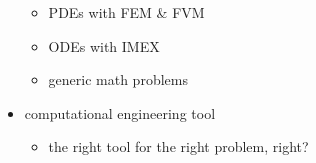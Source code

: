 \documentclass[
  ignorenonframetext,
  aspectratio=169,
]{beamer}
\providecommand{\tightlist}{%
  \setlength{\itemsep}{0pt}\setlength{\parskip}{0pt}}
\begin{document}
\begin{frame}{}
\begin{columns}[T]
\begin{column}{0.4\textwidth}
\begin{itemize}
  \begin{itemize}
  \tightlist
  \item
    PDEs with FEM \& FVM
  \item
    ODEs with IMEX
  \item
    generic math problems
  \end{itemize}
\item
  computational engineering tool

  \begin{itemize}
  \tightlist
  \item
    the right tool for the right problem, right?
  \end{itemize}
\end{itemize}
\end{column}
\end{columns}
\end{frame}
\end{document}
